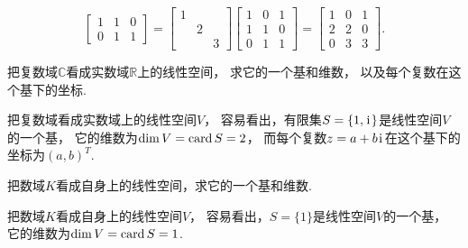 \begin{example}
\begin{solution}
\[\begin{bmatrix}
		1 & 1 & 0 \\
		0 & 1 & 1
	\end{bmatrix}
	= \begin{bmatrix}
		1 \\
		& 2 \\
		&& 3
	\end{bmatrix} \begin{bmatrix}
		1 & 0 & 1 \\
		1 & 1 & 0 \\
		0 & 1 & 1
	\end{bmatrix}
	= \begin{bmatrix}
		1 & 0 & 1 \\
		2 & 2 & 0 \\
		0 & 3 & 3
	\end{bmatrix}.
\]
\end{solution}
\end{example}

\begin{example}
把复数域\(\mathbb{C}\)看成实数域\(\mathbb{R}\)上的线性空间，
求它的一个基和维数，
以及每个复数在这个基下的坐标.
\begin{solution}
把复数域看成实数域上的线性空间\(V\)，
容易看出，有限集\(S = \{1,\kern1pt\mathrm{i}\kern1pt\}\)是线性空间\(V\)的一个基，
它的维数为\(\dim V = \operatorname{card} S = 2\)，
而每个复数\(z = a + b\kern1pt\mathrm{i}\kern1pt\)在这个基下的坐标为\((a,b)^T\).
\end{solution}
\end{example}

\begin{example}
把数域\(K\)看成自身上的线性空间，求它的一个基和维数.
\begin{solution}
把数域\(K\)看成自身上的线性空间\(V\)，
容易看出，\(S = \{1\}\)是线性空间\(V\)的一个基，
它的维数为\(\dim V = \operatorname{card} S = 1\).
\end{solution}
\end{example}
